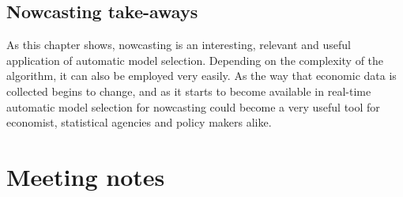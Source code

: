 \documentclass[11pt, oneside]{book}   	%
\begin{document}
\section{Nowcasting take-aways}

As this chapter shows, nowcasting is an interesting, relevant and useful application of automatic model selection. Depending on the complexity of the algorithm, it can also be employed very easily. As the way that economic data is collected begins to change, and as it starts to become available in real-time automatic model selection for nowcasting could become a very useful tool for economist, statistical agencies and policy makers alike.  










\chapter{Meeting notes}
\end{document}
